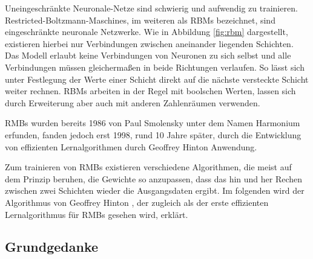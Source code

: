 Uneingeschränkte Neuronale-Netze sind schwierig und aufwendig zu trainieren. Restricted-Boltzmann-Maschines, im weiteren als RBMs bezeichnet, sind eingeschränkte neuronale Netzwerke. Wie in Abbildung \ref{fig:rbm} dargestellt, existieren hierbei nur Verbindungen zwischen aneinander liegenden Schichten. Das Modell erlaubt keine Verbindungen von Neuronen zu sich selbst und alle Verbindungen müssen gleichermaßen in beide Richtungen verlaufen. So lässt sich unter Festlegung der Werte einer Schicht direkt auf die nächste versteckte Schicht weiter rechnen. RBMs arbeiten in der Regel mit boolschen Werten, lassen sich durch Erweiterung aber auch mit anderen Zahlenräumen verwenden.

RMBs wurden bereits 1986 von Paul Smolensky \citep{rbm} unter dem Namen Harmonium erfunden, fanden jedoch erst 1998, rund 10 Jahre später, durch die Entwicklung von effizienten Lernalgorithmen durch Geoffrey Hinton Anwendung.

Zum trainieren von RMBs existieren verschiedene Algorithmen, die meist auf dem Prinzip beruhen, die Gewichte so anzupassen, dass das hin und her Rechen zwischen zwei Schichten wieder die Ausgangsdaten ergibt. Im folgenden wird der Algorithmus von Geoffrey Hinton \citep{BackpropagationFast}, der zugleich als der erste effizienten Lernalgorithmus für RMBs gesehen wird, erklärt.

\subsection{Grundgedanke}

